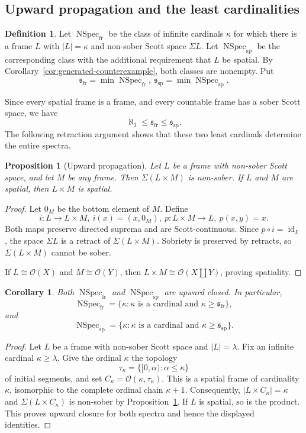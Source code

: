 \documentclass[11pt,reqno]{amsart}
\newtheorem{proposition}[theorem]{Proposition}
\newtheorem{corollary}[theorem]{Corollary}
\theoremstyle{definition}
\newtheorem{definition}[theorem]{Definition}
\numberwithin{equation}{section}
\newcommand{\OO}{\mathcal O}
\newcommand{\Specsp}{\operatorname{NSpec}_{\mathrm{sp}}}
\newcommand{\Specfr}{\operatorname{NSpec}_{\mathrm{fr}}}
\newcommand{\ssp}{\mathfrak{s}_{\mathrm{sp}}}
\newcommand{\sfr}{\mathfrak{s}_{\mathrm{fr}}}
\begin{document}
\subsection{Upward propagation and the least cardinalities}

\begin{definition}\label{def:spectra}
Let $\Specfr$ be the class of infinite cardinals $\kappa$ for which there
is a frame $L$ with $|L|=\kappa$ and non-sober Scott space $\Sigma L$.
Let $\Specsp$ be the corresponding class with the additional requirement
that $L$ be spatial. By Corollary~\ref{cor:generated-counterexample}, both
classes are nonempty. Put
\[
  \sfr=\min\Specfr,~ \ssp=\min\Specsp.
\]
\end{definition}

Since every spatial frame is a frame, and every countable frame has a
sober Scott space, we have
\[
  \aleph_1\leq\sfr\leq\ssp.
\]
The following retraction argument shows that these two least cardinals
determine the entire spectra.

\begin{proposition}[Upward propagation]\label{prop:upward}
Let $L$ be a frame with non-sober Scott space, and let $M$ be any frame.
Then $\Sigma(L\times M)$ is non-sober. If $L$ and $M$ are spatial, then
$L\times M$ is spatial.
\end{proposition}

\begin{proof}
Let $0_M$ be the bottom element of $M$. Define
\[
  i:L\longrightarrow L\times M,~ i(x)=(x,0_M),
  ~
  p:L\times M\longrightarrow L,~ p(x,y)=x.
\]
Both maps preserve directed suprema and are Scott-continuous. Since
$p\circ i=\operatorname{id}_L$, the space $\Sigma L$ is a retract of
$\Sigma(L\times M)$. Sobriety is preserved by retracts, so
$\Sigma(L\times M)$ cannot be sober.

If $L\cong\OO(X)$ and $M\cong\OO(Y)$, then
$L\times M\cong\OO(X\coprod Y)$, proving spatiality.
\end{proof}

\begin{corollary}\label{cor:spectrum-upward}
Both $\Specfr$ and $\Specsp$ are upward closed. In particular,
\[
  \Specfr=\{\kappa:\kappa\text{ is a cardinal and }\kappa\geq\sfr\},
\]
and
\[
  \Specsp=\{\kappa:\kappa\text{ is a cardinal and }\kappa\geq\ssp\}.
\]
\end{corollary}

\begin{proof}
Let $L$ be a frame with non-sober Scott space and $|L|=\lambda$. Fix an
infinite cardinal $\kappa\geq\lambda$. Give the ordinal $\kappa$ the
topology
\[
  \tau_\kappa=\{[0,\alpha):\alpha\leq\kappa\}
\]
of initial segments, and set
$C_\kappa=\OO(\kappa,\tau_\kappa)$. This is a spatial frame of cardinality
$\kappa$, isomorphic to the complete ordinal chain $\kappa+1$.
Consequently, $|L\times C_\kappa|=\kappa$ and
$\Sigma(L\times C_\kappa)$ is non-sober by
Proposition~\ref{prop:upward}. If $L$ is spatial, so is the product.
This proves upward closure for both spectra and hence the displayed
identities.
\end{proof}
\end{document}
